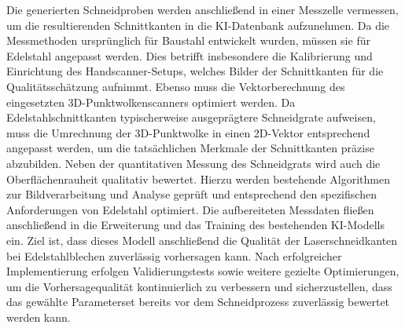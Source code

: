 Die generierten Schneidproben werden anschließend in einer Messzelle vermessen, um die resultierenden Schnittkanten in die KI-Datenbank aufzunehmen. Da die Messmethoden ursprünglich für Baustahl entwickelt wurden, müssen sie für Edelstahl angepasst werden. Dies betrifft insbesondere die Kalibrierung und Einrichtung des Handscanner-Setups, welches Bilder der Schnittkanten für die Qualitätsschätzung aufnimmt. Ebenso muss die Vektorberechnung des eingesetzten 3D-Punktwolkenscanners optimiert werden. Da Edelstahlschnittkanten typischerweise ausgeprägtere Schneidgrate aufweisen, muss die Umrechnung der 3D-Punktwolke in einen 2D-Vektor entsprechend angepasst werden, um die tatsächlichen Merkmale der Schnittkanten präzise abzubilden.
Neben der quantitativen Messung des Schneidgrats wird auch die Oberflächenrauheit qualitativ bewertet. Hierzu werden bestehende Algorithmen zur Bildverarbeitung und Analyse geprüft und entsprechend den spezifischen Anforderungen von Edelstahl optimiert.
Die aufbereiteten Messdaten fließen anschließend in die Erweiterung und das Training des bestehenden KI-Modells ein. Ziel ist, dass dieses Modell anschließend die Qualität der Laserschneidkanten bei Edelstahlblechen zuverlässig vorhersagen kann. Nach erfolgreicher Implementierung erfolgen Validierungstests sowie weitere gezielte Optimierungen, um die Vorhersagequalität kontinuierlich zu verbessern und sicherzustellen, dass das gewählte Parameterset bereits vor dem Schneidprozess zuverlässig bewertet werden kann.